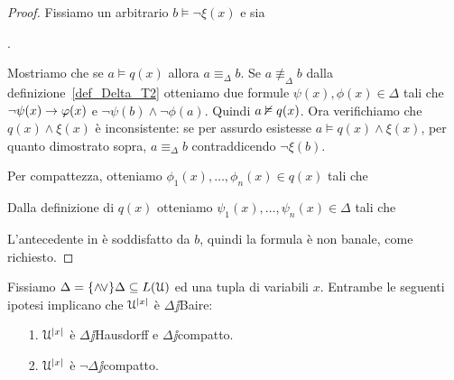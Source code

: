 \begin{proof}
Fissiamo un arbitrario $b\models\neg\xi(x)$ e sia 

. 

Mostriamo che se $a\models q(x)$ allora $a\equiv_\Delta b$. Se $a\nequiv_\Delta b$ dalla definizione~\ref{def_Delta_T2} otteniamo due formule $\psi(x),\phi(x)\in\Delta$ tali che $\neg\psi(x)\rightarrow\varphi(x)$ e $\neg\psi(b)\wedge\neg\phi(a)$. Quindi $a\nvDash q(x)$. Ora verifichiamo che $q(x)\wedge\xi(x)$ \`e inconsistente: se per assurdo esistesse $a\models q(x)\wedge\xi(x)$, per quanto dimostrato sopra, $a\equiv_\Delta b$ contraddicendo $\neg\xi(b)$. 

Per compattezza, otteniamo $\phi_1(x),\dots,\phi_n(x)\in q(x)$ tali che


Dalla definizione di $q(x)$ otteniamo $\psi_1(x),\dots,\psi_n(x)\in\Delta$ tali che 


L'antecedente in  \`e soddisfatto da $b$, quindi la formula  \`e non banale, come richiesto.
\end{proof}



\begin{theorem}\label{thm_cat_baire} Fissiamo $\Delta=\{\wedge\!\vee\}\Delta\subseteq L(\EuScript U)$ ed una tupla di variabili $x$. Entrambe le seguenti ipotesi implicano che $\EuScript U^{|x|}$ \`e $\Delta\jj$Baire:
\begin{itemize}
\item[1.]  $\EuScript U^{|x|}$ \`e $\Delta\jj$Hausdorff e $\Delta\jj$compatto.
\item[2.]  $\EuScript U^{|x|}$ \`e $\neg\!\Delta\jj$compatto.
\end{itemize}
\end{theorem}

